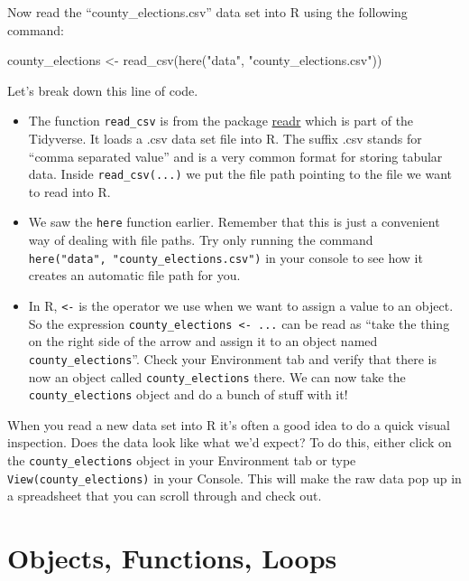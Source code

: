 \documentclass[
  letterpaper,
]{book}
\newenvironment{Shaded}{\begin{snugshade}}{\end{snugshade}}
\newcommand{\FunctionTok}[1]{\textcolor[rgb]{0.28,0.35,0.67}{#1}}
\newcommand{\NormalTok}[1]{\textcolor[rgb]{0.00,0.23,0.31}{#1}}
\newcommand{\OtherTok}[1]{\textcolor[rgb]{0.00,0.23,0.31}{#1}}
\newcommand{\StringTok}[1]{\textcolor[rgb]{0.13,0.47,0.30}{#1}}
\providecommand{\tightlist}{%
  \setlength{\itemsep}{0pt}\setlength{\parskip}{0pt}}\usepackage{longtable,booktabs,array}
\theoremstyle{definition}
\theoremstyle{definition}
\theoremstyle{plain}
\theoremstyle{definition}
\theoremstyle{plain}
\theoremstyle{plain}
\theoremstyle{remark}
\begin{document}
Now read the ``county\_elections.csv'' data set into R using the
following command:

\begin{Shaded}
\begin{Highlighting}[]
\NormalTok{county\_elections }\OtherTok{\textless{}{-}} \FunctionTok{read\_csv}\NormalTok{(}\FunctionTok{here}\NormalTok{(}\StringTok{"data"}\NormalTok{, }\StringTok{"county\_elections.csv"}\NormalTok{))}
\end{Highlighting}
\end{Shaded}

Let's break down this line of code.

\begin{itemize}
\tightlist
\item
  The function \texttt{read\_csv} is from the package
  \href{https://readr.tidyverse.org/}{readr} which is part of the
  Tidyverse. It loads a .csv data set file into R. The suffix .csv
  stands for ``comma separated value'' and is a very common format for
  storing tabular data. Inside \texttt{read\_csv(...)} we put the file
  path pointing to the file we want to read into R.
\item
  We saw the \texttt{here} function earlier. Remember that this is just
  a convenient way of dealing with file paths. Try only running the
  command \texttt{here("data",\ "county\_elections.csv")} in your
  console to see how it creates an automatic file path for you.
\item
  In R, \texttt{\textless{}-} is the operator we use when we want to
  assign a value to an object. So the expression
  \texttt{county\_elections\ \textless{}-\ ...} can be read as ``take
  the thing on the right side of the arrow and assign it to an object
  named \texttt{county\_elections}''. Check your Environment tab and
  verify that there is now an object called \texttt{county\_elections}
  there. We can now take the \texttt{county\_elections} object and do a
  bunch of stuff with it!
\end{itemize}

When you read a new data set into R it's often a good idea to do a quick
visual inspection. Does the data look like what we'd expect? To do this,
either click on the \texttt{county\_elections} object in your
Environment tab or type \texttt{View(county\_elections)} in your
Console. This will make the raw data pop up in a spreadsheet that you
can scroll through and check out.

\hypertarget{robjloops}{%
\chapter{Objects, Functions, Loops}\label{robjloops}}
\end{document}
